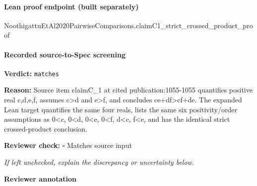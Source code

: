 \documentclass[10pt]{article}
\newcommand{\reviewerbox}{%
  \par\noindent\fbox{\parbox{0.96\linewidth}{\rule{0pt}{0.38in}}}\par
}
\newcommand{\reviewmatch}[1]{%
  \par\noindent\textbf{Reviewer check:} $\square$\; #1\par
  \noindent\emph{If left unchecked, explain the discrepancy or uncertainty below.}\par
}
\begin{document}
\paragraph{Lean proof endpoint (built separately)}\begin{ReviewVerbatim}
NoothigattuEtAl2020PairwiseComparisons.claimC1_strict_crossed_product_proof
\end{ReviewVerbatim}

\paragraph{Recorded source-to-Spec screening}
\textbf{Verdict:} \texttt{matches}
\\
{\raggedright
\textbf{Reason:} Source item claimC\_\allowbreak{}1 at cited publication:\allowbreak{}1055-\allowbreak{}1055 quantifies positive real c,d,e,f, assumes c>d and e>f, and concludes ce+df>cf+de.\allowbreak{} The expanded Lean target quantifies the same four reals, lists the same six positivity/\allowbreak{}order assumptions as 0<c, 0<d, 0<e, 0<f, d<c, f<e, and has the identical strict crossed-\allowbreak{}product conclusion.\allowbreak{}
\par}
\reviewmatch{Matches source input}
\noindent\textbf{Reviewer annotation}\par
\reviewerbox
\end{document}
